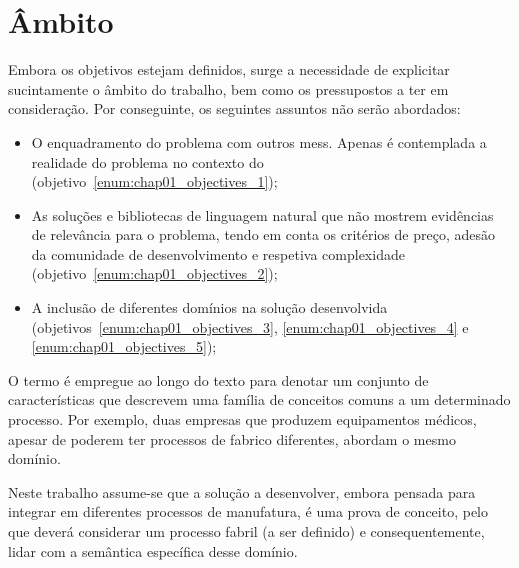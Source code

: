 \section{Âmbito}
\label{sec:chap01_scope}
Embora os objetivos estejam definidos, surge a necessidade de explicitar sucintamente o âmbito do trabalho, bem como os pressupostos a ter em consideração. Por conseguinte, os seguintes assuntos não serão abordados:

\begin{itemize}
    \item
    {
        O enquadramento do problema com outros \glspl{mes}. Apenas é contemplada a realidade do problema no contexto do {\productname} (objetivo~\ref{enum:chap01_objectives_1});
    }
    \item
    {
        As soluções e bibliotecas de linguagem natural que não mostrem evidências de relevância para o problema, tendo em conta os critérios de preço, adesão da comunidade de desenvolvimento e respetiva complexidade (objetivo~\ref{enum:chap01_objectives_2});
    }
    \item 
    {
        A inclusão de diferentes domínios na solução desenvolvida (objetivos~\ref{enum:chap01_objectives_3}, \ref{enum:chap01_objectives_4} e \ref{enum:chap01_objectives_5});
    }
\end{itemize}

O termo  é empregue ao longo do texto para denotar um conjunto de características que descrevem uma família de conceitos comuns a um determinado processo. Por exemplo, duas empresas que produzem equipamentos médicos, apesar de poderem ter processos de fabrico diferentes, abordam o mesmo domínio.

Neste trabalho assume-se que a solução a desenvolver, embora pensada para integrar em diferentes processos de manufatura, é uma prova de conceito, pelo que deverá considerar um processo fabril (a ser definido) e consequentemente, lidar com a semântica específica desse domínio.